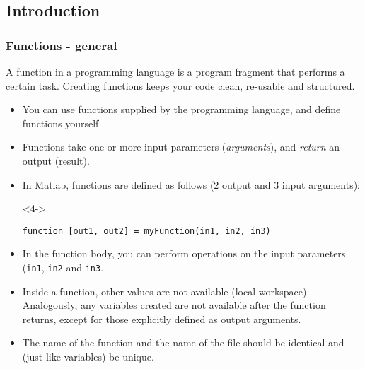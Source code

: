 \subsection*{Introduction}
\begin{frame}[fragile]
 \frametitle{Functions - general}
 A function in a programming language is a program fragment that performs a certain task. Creating functions keeps your code clean, re-usable and structured.
 \begin{itemize}
    \item You can use functions supplied by the programming language, and define functions yourself
    \item Functions take one or more input parameters (\emph{arguments}), and \emph{return} an output (result).
    \item In Matlab, functions are defined as follows (2 output and 3 input arguments):
  \begin{overlayarea}{\textwidth}{2em}
   \begin{onlyenv}<4->
    \begin{lstlisting}
function [out1, out2] = myFunction(in1, in2, in3)
    \end{lstlisting}
    \end{onlyenv}
   \end{overlayarea} 
   \item{} In the function body, you can perform operations on the input parameters (\lstinline$in1$, \lstinline$in2$ and \lstinline$in3$. 
   \item{} Inside a function, other values are not available (local workspace). Analogously, any variables created are not available after the function returns, except for those explicitly defined as output arguments.
   \item{} The name of the function and the name of the file should be identical and (just like variables) be unique.
  \end{itemize}
\end{frame}

